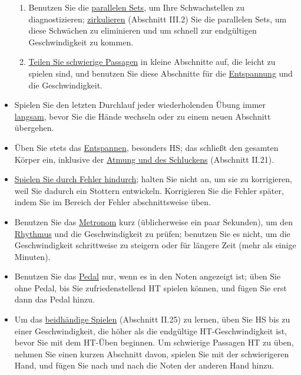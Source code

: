 \begin{itemize}
\begin{enumerate}[label={\alph*.}]
 \item Benutzen Sie die \hyperref[c1ii11]{parallelen Sets}, um Ihre Schwachstellen zu diagnostizieren; \hyperref[c1iii2]{zirkulieren} (Abschnitt III.2) Sie die parallelen Sets, um diese Schwächen zu eliminieren und um schnell zur endgültigen Geschwindigkeit zu kommen.
 
 \item \hyperref[c1ii6]{Teilen Sie schwierige Passagen} in kleine Abschnitte auf, die leicht zu spielen sind, und benutzen Sie diese Abschnitte für die \hyperref[c1ii14]{Entspannung} und die Geschwindigkeit.
 \end{enumerate}

\item Spielen Sie den letzten Durchlauf jeder wiederholenden Übung immer \hyperref[c1ii17]{langsam}, bevor Sie die Hände wechseln oder zu einem neuen Abschnitt übergehen.

\item Üben Sie stets das \hyperref[c1ii14]{Entspannen}, besonders HS; das schließt den gesamten Körper ein, inklusive der \hyperref[c1ii21]{Atmung und des Schluckens} (Abschnitt II.21).

\item \hyperref[c1ii22]{Spielen Sie durch Fehler hindurch}; halten Sie nicht an, um sie zu korrigieren, weil Sie dadurch ein Stottern entwickeln.
Korrigieren Sie die Fehler später, indem Sie im Bereich der Fehler abschnittsweise üben.

\item Benutzen Sie das \hyperref[c1ii19]{Metronom} kurz (üblicherweise ein paar Sekunden), um den \hyperref[c1iii1b]{Rhythmus} und die Geschwindigkeit zu prüfen; benutzen Sie es nicht, um die Geschwindigkeit schrittweise zu steigern oder für längere Zeit (mehr als einige Minuten).

\item Benutzen Sie das \hyperref[c1ii23]{Pedal} nur, wenn es in den Noten angezeigt ist; üben Sie ohne Pedal, bis Sie zufriedenstellend HT spielen können, und fügen Sie erst dann das Pedal hinzu.

\item Um das \hyperref[c1ii25]{beidhändige Spielen} (Abschnitt II.25) zu lernen, üben Sie HS bis zu einer Geschwindigkeit, die höher als die endgültige HT-Geschwindigkeit ist, bevor Sie mit dem HT-Üben beginnen.
Um schwierige Passagen HT zu üben, nehmen Sie einen kurzen Abschnitt davon, spielen Sie mit der schwierigeren Hand, und fügen Sie nach und nach die Noten der anderen Hand hinzu.


\end{itemize}
